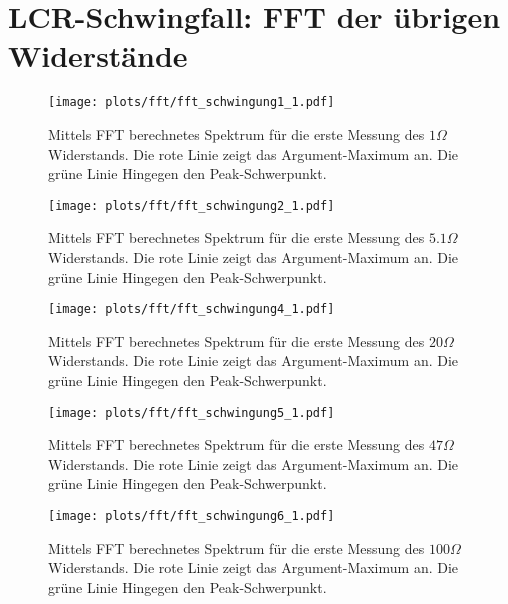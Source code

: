 \documentclass[a4paper, 12pt]{scrartcl}
\begin{document}
\section{LCR-Schwingfall: FFT der übrigen Widerstände}\label{app:fft}
\begin{figure}[H]
\centering
\texttt{[image: plots/fft/fft\_schwingung1\_1.pdf]}
\caption{Mittels FFT berechnetes Spektrum für die erste Messung des $1\Omega$ Widerstands. Die rote Linie zeigt das Argument-Maximum an. Die grüne Linie Hingegen den Peak-Schwerpunkt.}
\end{figure}
\begin{figure}[H]
\centering
\texttt{[image: plots/fft/fft\_schwingung2\_1.pdf]}
\caption{Mittels FFT berechnetes Spektrum für die erste Messung des $5.1\Omega$ Widerstands. Die rote Linie zeigt das Argument-Maximum an. Die grüne Linie Hingegen den Peak-Schwerpunkt.}
\end{figure}
\begin{figure}[H]
\centering
\texttt{[image: plots/fft/fft\_schwingung4\_1.pdf]}
\caption{Mittels FFT berechnetes Spektrum für die erste Messung des $20\Omega$ Widerstands. Die rote Linie zeigt das Argument-Maximum an. Die grüne Linie Hingegen den Peak-Schwerpunkt.}
\end{figure}
\begin{figure}[H]
\centering
\texttt{[image: plots/fft/fft\_schwingung5\_1.pdf]}
\caption{Mittels FFT berechnetes Spektrum für die erste Messung des $47\Omega$ Widerstands. Die rote Linie zeigt das Argument-Maximum an. Die grüne Linie Hingegen den Peak-Schwerpunkt.}
\end{figure}
\begin{figure}[H]
\centering
\texttt{[image: plots/fft/fft\_schwingung6\_1.pdf]}
\caption{Mittels FFT berechnetes Spektrum für die erste Messung des $100\Omega$ Widerstands. Die rote Linie zeigt das Argument-Maximum an. Die grüne Linie Hingegen den Peak-Schwerpunkt.}
\end{figure}
\end{document}

